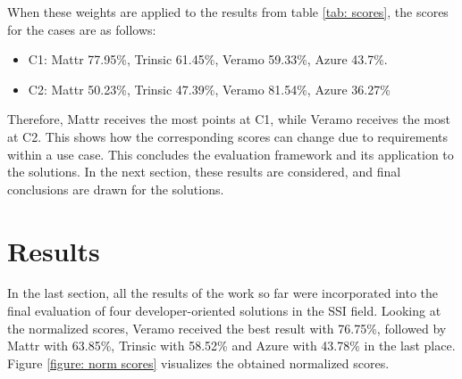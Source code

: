     \begin{table}[h]
    \caption{Exemplary weights}
    \label{tab: weights}
    \end{table}
    
    When these weights are applied to the results from table \ref{tab: scores}, the scores for the cases are as follows:
    \begin{itemize}
        \item C1: Mattr 77.95\%, Trinsic 61.45\%, Veramo 59.33\%, Azure 43.7\%.
        \item C2: Mattr 50.23\%, Trinsic 47.39\%, Veramo 81.54\%, Azure 36.27\%
    \end{itemize}

    Therefore, Mattr receives the most points at C1, while Veramo receives the most at C2. This shows how the corresponding scores can change due to requirements within a use case. This concludes the evaluation framework and its application to the solutions. In the next section, these results are considered, and final conclusions are drawn for the solutions.
    
	\section{Results}
	
    In the last section, all the results of the work so far were incorporated into the final evaluation of four developer-oriented solutions in the \ac{SSI} field. Looking at the normalized scores, Veramo received the best result with 76.75\%, followed by Mattr with 63.85\%, Trinsic with 58.52\% and Azure with 43.78\% in the last place. Figure \ref{figure: norm scores} visualizes the obtained normalized scores.
    
